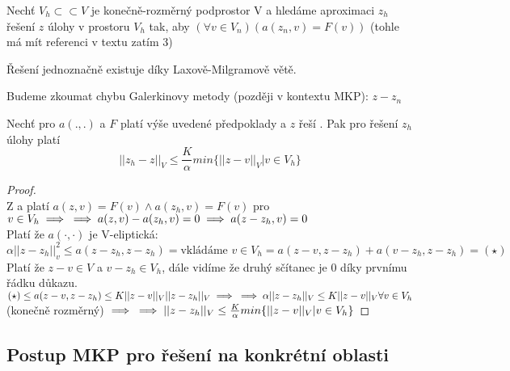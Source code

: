 \documentclass[../main.tex]{subfiles}
\begin{document}
Nechť $V_h \subset \subset V$ je konečně-rozměrný podprostor V a hledáme aproximaci $z_h$ řešení $z$ úlohy  v prostoru $V_h$ tak, aby $(\forall v\in V_n)(a(z_n,v) = F(v))$ (tohle má mít referenci v textu zatím 3)


\begin{remark}
    Řešení  jednoznačně existuje díky Laxově-Milgramově větě.
\end{remark}

\begin{remark}
    Budeme zkoumat chybu Galerkinovy metody (později v kontextu MKP): $z-z_n$
\end{remark}

\begin{theorem}[Céova]
    

Nechť pro $a(.,.)$ a $F$ platí výše uvedené předpoklady a $z$ řeší  . Pak pro řešení $z_h$ úlohy  platí 
\begin{equation}
    ||z_h - z||_V \leq \frac{K}{\alpha} min\{||z - v||_V | v\in V_h \}
\end{equation} 
\end{theorem}

\begin{proof}
    \ \\
    Z  a  platí $a(z,v) = F(v) \wedge a(z_h, v) = F(v)$ pro $ v\in V_h  \implies \\ \implies a(z,v) - a(z_h,v)=0 \implies a(z - z_h, v)= 0$
    \\
    Platí že $a(\cdot,\cdot)$ je V-eliptická:\\ $\alpha ||z - z_h||^2_v \leq a(z-z_h, z-z_h) = \text{vkládáme } v \in V_h = a(z-v, z-z_h) + a(v-z_h, z-z_h) = (\star)$
    \\
    Platí že $z-v \in V$ a $v - z_h \in V_h$, dále vidíme že druhý sčítanec je 0 díky prvnímu řádku důkazu. 
    \\
    $(\star) \leq a(z-v, z-z_h) \leq K ||z-v||_V ||z-z_h||_V \implies \\ \implies \alpha||z-z_h||_V \leq K ||z-v||_V \forall v\in V_h$ (konečně rozměrný)
$\implies \\ \implies ||z-z_h||_V  \leq \frac{K}{\alpha} min\{||z-v||_V |v\in V_h  \}$
\end{proof}


\subsection{Postup MKP pro řešení  na konkrétní oblasti}
\end{document}
